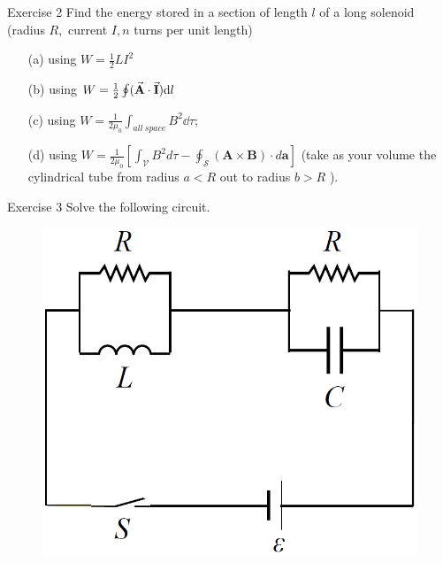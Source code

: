\documentclass[9pt]{beamer}
\begin{document}
\begin{frame}{Exercise 2}
    Find the energy stored in a section of length $l$ of a long solenoid (radius $R,$ current $I, n$ turns per unit length)
    \begin{itemize}
        \item[(a)] using $W=\frac{1}{2}LI^2$ 
        \item[(b)] using $W=\frac{1}{2}\oint(\va{A}\cdot\va{I})\dd l$ 
        \item[(c)] using $W=\frac{1}{2\mu_0}\int_{all \ space}B^2\dd \tau$;
        \item[(d)] using $W=\frac{1}{2 \mu_{0}}\left[\int_{\mathcal{V}} B^{2} d \tau-\oint_{\mathcal{S}}(\mathbf{A} \times \mathbf{B}) \cdot d \mathbf{a}\right]$ (take as your volume the cylindrical tube from radius $a<R$ out to radius $b>R$ ).
    \end{itemize}
\end{frame}

\begin{frame}{Exercise 3}
    Solve the following circuit.

\begin{figure}[htbp]
    \centering
    \includegraphics[scale=0.6]{images/ex3.png}
\end{figure}
\end{frame}


\end{document}
